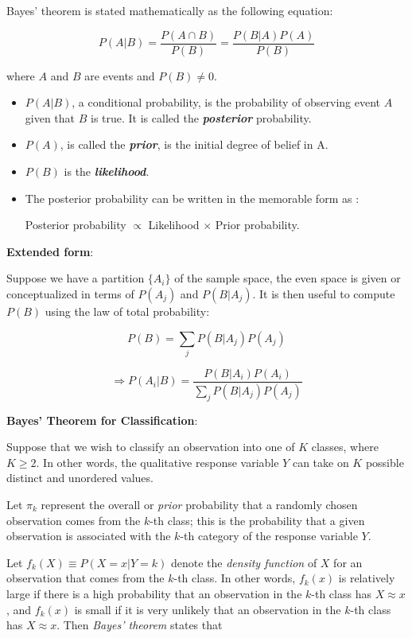 \documentclass[]{book}
\providecommand{\tightlist}{%
  \setlength{\itemsep}{0pt}\setlength{\parskip}{0pt}}
\newenvironment{rmdblock}[1]
  {\begin{shaded*}
  \begin{itemize}
  \renewcommand{\labelitemi}{
    \raisebox{-.7\height}[0pt][0pt]{
      {\setkeys{Gin}{width=2em,keepaspectratio}\texttt{[image: img/icons/\#1]}}
    }
  }
  \item
  }
  {
  \end{itemize}
  \end{shaded*}
  }
\newenvironment{rmdinsight}
  {\begin{rmdblock}{insight}}
  {\end{rmdblock}}
\theoremstyle{definition}
\theoremstyle{definition}
\theoremstyle{definition}
\theoremstyle{remark}
\begin{document}
Bayes' theorem is stated mathematically as the following equation:

\[ P(A | B) = \frac{P(A \cap B)}{P(B)} =  \frac{P(B|A) P(A)}{P(B)}\]

where \(A\) and \(B\) are events and \(P(B) \neq 0\).

\begin{itemize}
\tightlist
\item
  \(P(A | B)\), a conditional probability, is the probability of
  observing event \(A\) given that \(B\) is true. It is called the
  \textbf{\emph{posterior}} probability.
\item
  \(P(A)\), is called the \textbf{\emph{prior}}, is the initial degree
  of belief in A.
\item
  \(P(B)\) is the \textbf{\emph{likelihood}}.
\end{itemize}

\begin{rmdinsight}
The posterior probability can be written in the memorable form as :

Posterior probability \(\propto\) Likelihood \(\times\) Prior
probability.
\end{rmdinsight}

\textbf{Extended form}:

Suppose we have a partition \(\{A_i\}\) of the sample space, the even
space is given or conceptualized in terms of \(P(A_j)\) and
\(P(B | A_j)\). It is then useful to compute \(P(B)\) using the law of
total probability:

\[ P(B) = \sum_j P(B|A_j) P(A_j) \]

\[ \Rightarrow P(A_i|B) = \frac{P(B|A_i) P(A_i)}{\sum_j P(B|A_j) P(A_j)} \]

\textbf{Bayes' Theorem for Classification}:

Suppose that we wish to classify an observation into one of \(K\)
classes, where \(K \geq 2\). In other words, the qualitative response
variable \(Y\) can take on \(K\) possible distinct and unordered values.

Let \(\pi_k\) represent the overall or \emph{prior} probability that a
randomly chosen observation comes from the \(k\)-th class; this is the
probability that a given observation is associated with the \(k\)-th
category of the response variable \(Y\).

Let \(f_k(X) \equiv P(X = x|Y = k)\) denote the \emph{density function}
of \(X\) for an observation that comes from the \(k\)-th class. In other
words, \(f_k(x)\) is relatively large if there is a high probability
that an observation in the \(k\)-th class has \(X \approx x\), and
\(f_k(x)\) is small if it is very unlikely that an observation in the
\(k\)-th class has \(X \approx x\). Then \emph{Bayes' theorem} states
that
\end{document}
